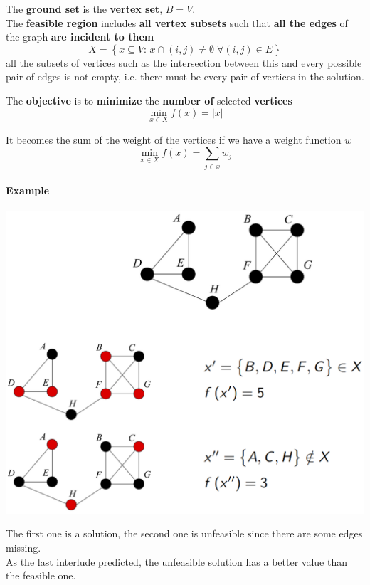 \documentclass[11pt]{article}
\begin{document}
	The \textbf{ground set} is the \textbf{vertex set}, $B = V$.\\
	
	The \textbf{feasible region} includes \textbf{all vertex subsets} such that \textbf{all the edges} of the graph \textbf{are incident to them}
	$$ X = \left\{x \subseteq V : \, x \cap (i,j) \neq \emptyset \; \forall (i,j) \in E \right\}$$
	all the subsets of vertices such as the intersection between this and every possible pair of edges is not empty, i.e. there must be every pair of vertices in the solution.
	
	The \textbf{objective} is to \textbf{minimize} the \textbf{number of} selected \textbf{vertices}
	$$ \min_{x \in X} f(x) = |x| $$
	
	It becomes the sum of the weight of the vertices if we have a weight function $w$
	$$ \min_{x \in X} f(x) = \sum_{j \in x} w_j $$
	
	\newpage
	
	\paragraph{Example}
	\begin{center}
		\includegraphics[width=\columnwidth]{img/VCP1}
	\end{center}
	The first one is a solution, the second one is unfeasible since there are some edges missing.\\
	As the last interlude predicted, the unfeasible solution has a better value than the feasible one.\\
	
\end{document}
